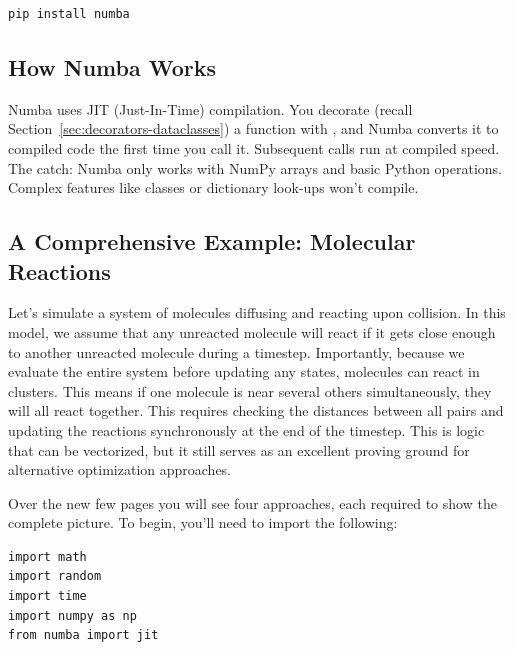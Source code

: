 \begin{lstlisting}[style=shellstyle]
pip install numba
\end{lstlisting}

\subsection{How Numba Works}
\label{sec:Numba}
Numba uses JIT (Just-In-Time) compilation. You decorate (recall Section~\ref{sec:decorators-dataclasses}) a function with , and Numba converts it to compiled code the first time you call it. Subsequent calls run at compiled speed. The catch: Numba only works with NumPy arrays and basic Python operations. Complex features like classes or dictionary look-ups won't compile.

\subsection{A Comprehensive Example: Molecular Reactions}

Let's simulate a system of molecules diffusing and reacting upon collision. In this model, we assume that any unreacted molecule will react if it gets close enough to another unreacted molecule during a timestep. Importantly, because we evaluate the entire system before updating any states, molecules can react in clusters. This means if one molecule is near several others simultaneously, they will all react together. This requires checking the distances between all pairs and updating the reactions synchronously at the end of the timestep. This is logic that can be vectorized, but it still serves as an excellent proving ground for alternative optimization approaches. 

Over the new few pages you will see four approaches, each required to show the complete picture. To begin, you'll need to import the following:

\begin{lstlisting}
import math
import random
import time
import numpy as np
from numba import jit
\end{lstlisting}

